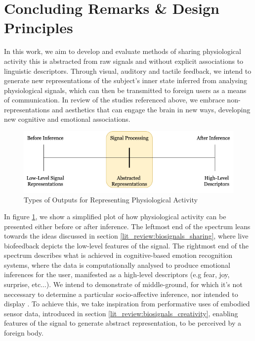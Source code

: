 \section{Concluding Remarks \& Design Principles}
\label{lit_review:conclusion}

In this work, we aim to develop and evaluate methods of sharing physiological activity this is abstracted from raw signals and without explicit associations to linguistic descriptors. Through visual, auditory and tactile feedback, we intend to generate new representations of the subject's inner state inferred from analysing physiological signals, which can then be transmitted to foreign users as a means of communication. In review of the studies referenced above, we embrace non-representations and aesthetics that can engage the brain in new ways, developing new cognitive and emotional associations.

\begin{figure}[htbp]
	\centering
	\includegraphics[width=1.0\textwidth]{Chapters/Figures/Abstracted_Representations.png}
	\caption{Types of Outputs for Representing Physiological Activity}
	\label{fig:Abstracted_Representations}
\end{figure}

In figure \ref{fig:Abstracted_Representations}, we show a simplified plot of how physiological activity can be presented either before or after inference. The leftmost end of the spectrum leans towards the ideas discussed in section \ref{lit_review:biosignals_sharing}, where live biofeedback depicts the low-level features of the signal. The rightmost end of the spectrum describes what is achieved in cognitive-based emotion recognition systems, where the data is computationally analysed to produce emotional inferences for the user, manifested as a high-level descriptors (e.g fear, joy, surprise, etc...). We intend to demonstrate of middle-ground, for which it's not neccessary to determine a particular socio-affective inference, nor intended to display . To achieve this, we take inspiration from performative uses of embodied sensor data, introduced in section \ref{lit_review:biosignals_creativity}, enabling features of the signal to generate abstract representation, to be perceived by a foreign body.

